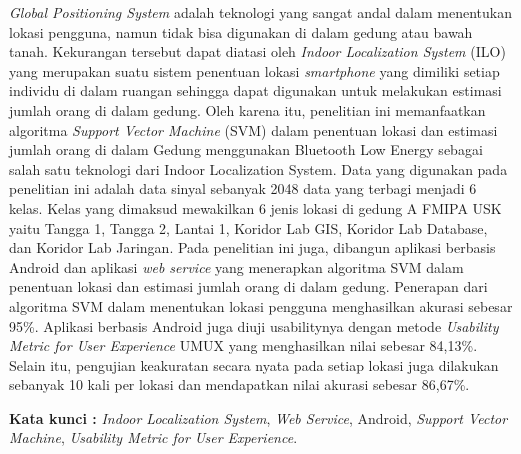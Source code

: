 \begin{abstractind}
	\textit{Global Positioning System} adalah teknologi yang sangat andal dalam menentukan lokasi pengguna, namun tidak bisa digunakan di dalam gedung atau bawah tanah. Kekurangan tersebut dapat diatasi oleh \textit{Indoor Localization System} (ILO) yang merupakan suatu sistem penentuan lokasi \textit{smartphone} yang dimiliki setiap individu di dalam ruangan sehingga dapat digunakan untuk melakukan estimasi jumlah orang di dalam gedung. Oleh karena itu, penelitian ini memanfaatkan algoritma \textit{Support Vector Machine} (SVM) dalam penentuan lokasi dan estimasi jumlah orang di dalam Gedung menggunakan Bluetooth Low Energy sebagai salah satu teknologi dari Indoor Localization System. Data yang digunakan pada penelitian ini adalah data sinyal sebanyak 2048 data yang terbagi menjadi 6 kelas. Kelas yang dimaksud mewakilkan 6 jenis lokasi di gedung A FMIPA USK yaitu Tangga 1, Tangga 2, Lantai 1, Koridor Lab GIS, Koridor Lab Database, dan Koridor Lab Jaringan. Pada penelitian ini juga, dibangun aplikasi berbasis Android dan aplikasi \textit{web service} yang menerapkan algoritma SVM dalam penentuan lokasi dan estimasi jumlah orang di dalam gedung. Penerapan dari algoritma SVM dalam menentukan lokasi pengguna menghasilkan akurasi sebesar 95\%. Aplikasi berbasis Android juga diuji usabilitynya dengan metode \textit{Usability Metric for User Experience} UMUX yang menghasilkan nilai  sebesar 84,13\%. Selain itu, pengujian keakuratan secara nyata  pada setiap lokasi juga dilakukan sebanyak 10 kali per lokasi dan mendapatkan nilai akurasi sebesar 86,67\%.

	\bigskip
	\noindent
	\textbf{Kata kunci :} \textit{Indoor Localization System}, \textit{Web Service}, Android, \textit{Support Vector Machine}, \textit{Usability Metric for User Experience}.
\end{abstractind}